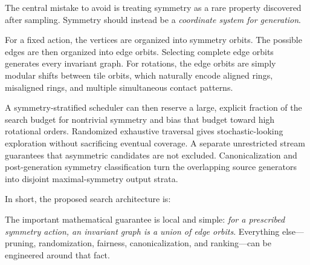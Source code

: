 \documentclass[11pt]{article}
\begin{document}
The central mistake to avoid is treating symmetry as a rare property discovered after sampling. Symmetry should instead be a \emph{coordinate system for generation}.

For a fixed action, the vertices are organized into symmetry orbits. The possible edges are then organized into edge orbits. Selecting complete edge orbits generates every invariant graph. For rotations, the edge orbits are simply modular shifts between tile orbits, which naturally encode aligned rings, misaligned rings, and multiple simultaneous contact patterns.

A symmetry-stratified scheduler can then reserve a large, explicit fraction of the search budget for nontrivial symmetry and bias that budget toward high rotational orders. Randomized exhaustive traversal gives stochastic-looking exploration without sacrificing eventual coverage. A separate unrestricted stream guarantees that asymmetric candidates are not excluded. Canonicalization and post-generation symmetry classification turn the overlapping source generators into disjoint maximal-symmetry output strata.

In short, the proposed search architecture is:

\begin{center}
\end{center}

The important mathematical guarantee is local and simple: \emph{for a prescribed symmetry action, an invariant graph is a union of edge orbits}. Everything else---pruning, randomization, fairness, canonicalization, and ranking---can be engineered around that fact.
\end{document}
